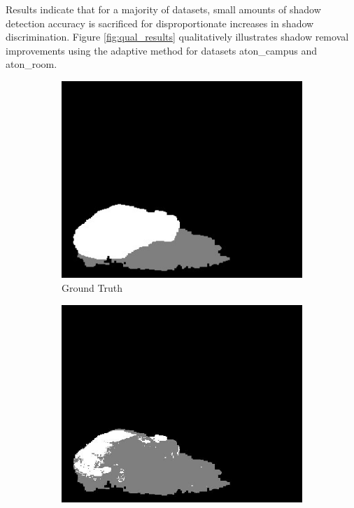 Results indicate that for a majority of datasets, small amounts of shadow detection accuracy is sacrificed for disproportionate increases in shadow discrimination. Figure \ref{fig:qual_results} qualitatively illustrates shadow removal improvements using the adaptive method for datasets aton\_campus and aton\_room.

\begin{figure}
  \centering
  \caption{Qualitative shadow removal improvement. (a - c) feature the aton\_campus dataset, and (d - f) feature the aton\_room datasets.}
  \begin{subfigure}{.32\linewidth}
  \includegraphics[width=1\linewidth]{figures/model/campus_0061_gt.jpg}
  \caption{Ground Truth}
  \end{subfigure}
  \hfill
  \begin{subfigure}{.32\linewidth}
  \includegraphics[width=1\linewidth]{figures/model/campus_0061_default.jpg}

\end{subfigure}
\end{figure}
